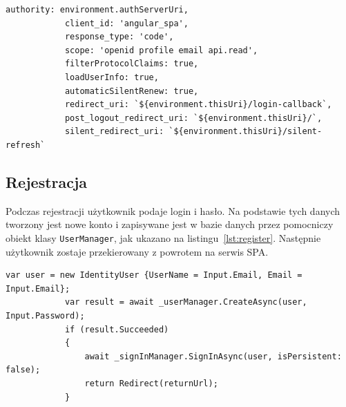 		\begin{lstlisting}[label=lst:openIdSpa, caption=Konfiguracja OpenId po stronie Spa, float=h]
			authority: environment.authServerUri,
			client_id: 'angular_spa',
			response_type: 'code',
			scope: 'openid profile email api.read',
			filterProtocolClaims: true,
			loadUserInfo: true,
			automaticSilentRenew: true,
			redirect_uri: `${environment.thisUri}/login-callback`,
			post_logout_redirect_uri: `${environment.thisUri}/`,
			silent_redirect_uri: `${environment.thisUri}/silent-refresh`
		\end{lstlisting}

	\newpage
	\subsection{Rejestracja}
		Podczas rejestracji użytkownik podaje login i hasło.
		Na podstawie tych danych tworzony jest nowe konto i zapisywane jest w bazie danych przez pomocniczy obiekt klasy \verb|UserManager|,
		jak ukazano na listingu~\ref{lst:register}.
		Następnie użytkownik zostaje przekierowany z powrotem na serwis SPA.

		\begin{lstlisting}[label=lst:register, caption=Fragment kodu rejestacji, float=h]
			var user = new IdentityUser {UserName = Input.Email, Email = Input.Email};
			var result = await _userManager.CreateAsync(user, Input.Password);
			if (result.Succeeded)
			{
				await _signInManager.SignInAsync(user, isPersistent: false);
				return Redirect(returnUrl);
			}
		\end{lstlisting}

